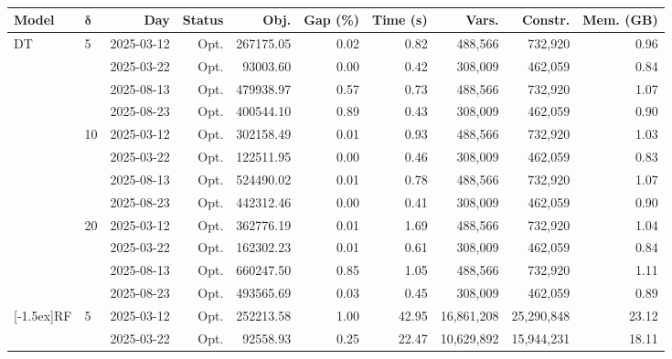 \begin{table}[!h]
    \centering
        \caption{}
        \label{}
        \scriptsize
        \setlength{\tabcolsep}{3pt}
        \begin{tabular}{llrrrrrrrr}
            \toprule
            \textbf{Model} 
            & \(\boldsymbol{\delta}\)
            & \textbf{Day}
            & \textbf{Status}
            & \textbf{Obj.}
            & \textbf{Gap (\%)}
            & \textbf{Time (s)}
            & \textbf{Vars.}
            & \textbf{Constr.}
            & \textbf{Mem. (GB)} \\
            \midrule
            \multirow{12}{*}[-1.5ex]{DT} & \multirow{4}{*}{5} & 2025-03-12 & Opt. & 267175.05 & 0.02 & 0.82 & 488,566 & 732,920 & 0.96 \\
             &  & 2025-03-22 & Opt. & 93003.60 & 0.00 & 0.42 & 308,009 & 462,059 & 0.84 \\
             &  & 2025-08-13 & Opt. & 479938.97 & 0.57 & 0.73 & 488,566 & 732,920 & 1.07 \\
             &  & 2025-08-23 & Opt. & 400544.10 & 0.89 & 0.43 & 308,009 & 462,059 & 0.90 \\
            \addlinespace
             & \multirow{4}{*}{10} & 2025-03-12 & Opt. & 302158.49 & 0.01 & 0.93 & 488,566 & 732,920 & 1.03 \\
             &  & 2025-03-22 & Opt. & 122511.95 & 0.00 & 0.46 & 308,009 & 462,059 & 0.83 \\
             &  & 2025-08-13 & Opt. & 524490.02 & 0.01 & 0.78 & 488,566 & 732,920 & 1.07 \\
             &  & 2025-08-23 & Opt. & 442312.46 & 0.00 & 0.41 & 308,009 & 462,059 & 0.90 \\
            \addlinespace
             & \multirow{4}{*}{20} & 2025-03-12 & Opt. & 362776.19 & 0.01 & 1.69 & 488,566 & 732,920 & 1.04 \\
             &  & 2025-03-22 & Opt. & 162302.23 & 0.01 & 0.61 & 308,009 & 462,059 & 0.84 \\
             &  & 2025-08-13 & Opt. & 660247.50 & 0.85 & 1.05 & 488,566 & 732,920 & 1.11 \\
             &  & 2025-08-23 & Opt. & 493565.69 & 0.03 & 0.45 & 308,009 & 462,059 & 0.89 \\
            \addlinespace
            \midrule
            \multirow{12}{*}[-1.5ex]{RF} & \multirow{4}{*}{5} & 2025-03-12 & Opt. & 252213.58 & 1.00 & 42.95 & 16,861,208 & 25,290,848 & 23.12 \\
             &  & 2025-03-22 & Opt. & 92558.93 & 0.25 & 22.47 & 10,629,892 & 15,944,231 & 18.11 \\

\end{tabular}
\end{table}
